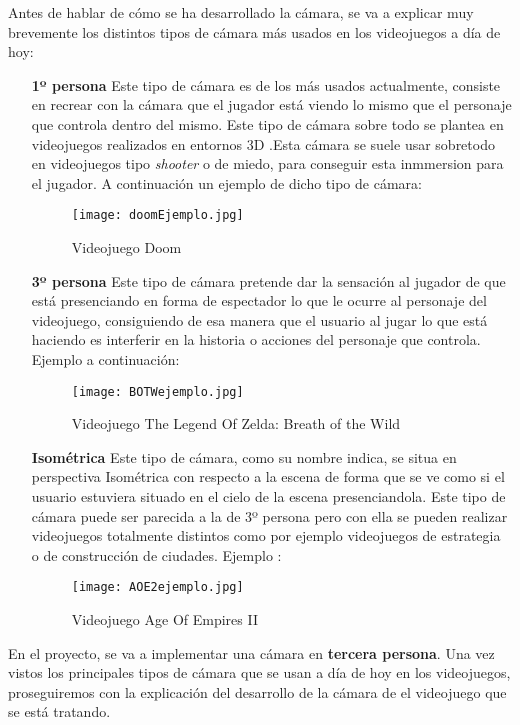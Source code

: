 Antes de hablar de cómo se ha desarrollado la cámara, se va a explicar muy brevemente los distintos tipos de cámara más usados en los videojuegos a día de hoy: 
\begin{enumerate}
    \item[\textbf{1º persona}] Este tipo de cámara es de los más usados actualmente, consiste en recrear con la cámara 
    que el jugador está viendo lo mismo que el personaje que controla dentro del mismo. Este tipo de cámara sobre todo se plantea en videojuegos realizados en entornos 3D .Esta cámara se suele usar sobretodo en 
    videojuegos tipo \textit{shooter} o de miedo, para conseguir esta inmmersion para el jugador. A continuación un ejemplo de dicho tipo de cámara:
    \begin{figure}[H]
        \centering
        \texttt{[image: doomEjemplo.jpg]}
        \caption{Videojuego Doom}
    \end{figure}
    \item[\textbf{3º persona}] Este tipo de cámara pretende dar la sensación al jugador de que está presenciando
    en forma de espectador lo que le ocurre al personaje del videojuego, consiguiendo de esa manera que el usuario
    al jugar lo que está haciendo es interferir en la historia o acciones del personaje que controla. Ejemplo a continuación:
    \begin{figure}[H]
        \texttt{[image: BOTWejemplo.jpg]}
        \caption{Videojuego The Legend Of Zelda: Breath of the Wild}
    \end{figure}
    \item[\textbf{Isométrica}] Este tipo de cámara, como su nombre indica, se situa en perspectiva 
    Isométrica con respecto a la escena de forma que se ve como si el usuario estuviera situado en el cielo de la escena presenciandola.
    Este tipo de cámara puede ser parecida a la de 3º persona pero con ella se pueden realizar videojuegos totalmente distintos como por ejemplo videojuegos de estrategia o de construcción de ciudades.
    Ejemplo : 
    \begin{figure}[H]
        \centering
        \texttt{[image: AOE2ejemplo.jpg]}
        \caption{Videojuego Age Of Empires II}
    \end{figure}
\end{enumerate}

En el proyecto, se va a implementar una cámara en \textbf{tercera persona}. Una vez vistos los principales tipos de cámara que se usan a día de hoy en los videojuegos, proseguiremos con la explicación
del desarrollo de la cámara de el videojuego que se está tratando.

